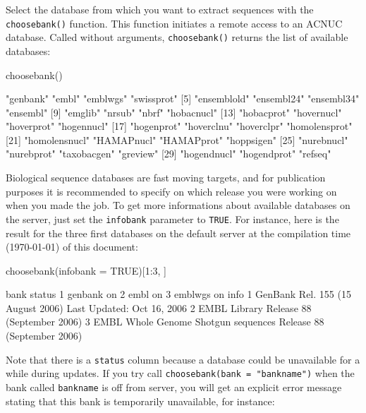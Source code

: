 \documentclass{article}
\begin{document}
Select the database from which you want to extract sequences with the \texttt{choosebank()} function.
This function initiates a remote access to an ACNUC database. Called without arguments,
\texttt{choosebank()} returns the list of available databases:

\begin{Schunk}
\begin{Sinput}
 choosebank()
\end{Sinput}
\begin{Soutput}
 [1] "genbank"      "embl"         "emblwgs"      "swissprot"   
 [5] "ensemblold"   "ensembl24"    "ensembl34"    "ensembl"     
 [9] "emglib"       "nrsub"        "nbrf"         "hobacnucl"   
[13] "hobacprot"    "hovernucl"    "hoverprot"    "hogennucl"   
[17] "hogenprot"    "hoverclnu"    "hoverclpr"    "homolensprot"
[21] "homolensnucl" "HAMAPnucl"    "HAMAPprot"    "hoppsigen"   
[25] "nurebnucl"    "nurebprot"    "taxobacgen"   "greview"     
[29] "hogendnucl"   "hogendprot"   "refseq"      
\end{Soutput}
\end{Schunk}

Biological sequence databases are fast moving targets, and for publication purposes it is
recommended to specify on which release you were working on when you made the job.
To get more informations about available databases on the server, just set 
the \texttt{infobank} parameter to \texttt{TRUE}. For
instance, here is the result for the three first databases on the default server 
at the compilation time (\today) of this document:

\begin{Schunk}
\begin{Sinput}
 choosebank(infobank = TRUE)[1:3, ]
\end{Sinput}
\begin{Soutput}
     bank status
1 genbank     on
2    embl     on
3 emblwgs     on
                                                              info
1     GenBank Rel. 155 (15 August 2006) Last Updated: Oct 16, 2006
2                         EMBL Library Release 88 (September 2006)
3 EMBL Whole Genome Shotgun sequences Release 88  (September 2006)
\end{Soutput}
\end{Schunk}

Note that there is a \texttt{status} column because a database could be unavailable
for a while during updates. If you try call \texttt{choosebank(bank = "bankname")} 
when the bank called \texttt{bankname} is off from server, you will get an explicit 
error message stating that this bank is temporarily unavailable, for instance:
\end{document}
